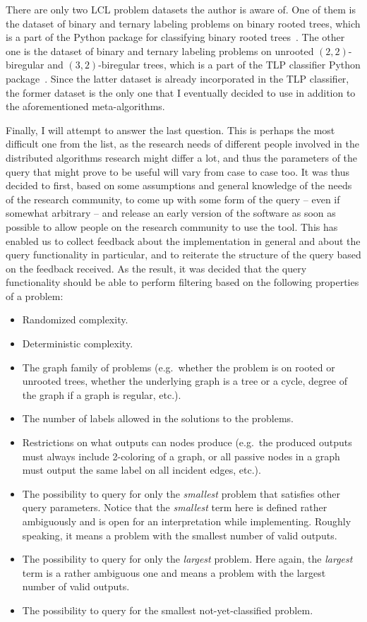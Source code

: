 There are only two LCL problem datasets the author is aware of. One of them is the dataset of binary and ternary labeling problems on binary rooted trees, which is a
part of the Python package for classifying binary rooted trees~\cite{Tereshchenko2020brt}. The other one is the dataset of binary and ternary labeling problems on
unrooted $(2, 2)$-biregular and $(3, 2)$-biregular trees, which is a part of the TLP classifier Python package~\cite{Rocher2020clas}. Since the latter dataset is already incorporated in the TLP classifier,
the former dataset is the only one that I eventually decided to use
in addition to the aforementioned meta-algorithms.

Finally, I will attempt to answer the last question.
This is perhaps the most difficult one from the list,
as the research needs of different people involved in
the distributed algorithms research might differ a lot, and thus
the parameters of the query that might prove to be useful
will vary from case to case too. It was thus decided to first,
based on some assumptions and general knowledge of the
needs of the research community, to come up with some form of the
query -- even if somewhat arbitrary -- and release an early version
of the software as soon as possible to allow people on the
research community to use the tool. This has enabled us to
collect feedback about the implementation in general and about the
query functionality in particular, and to reiterate the structure of
the query based on the feedback received. As the result, it was
decided that the query functionality should be able to perform
filtering based on the following properties of a problem:

\begin{itemize}
  \item Randomized complexity.
  \item Deterministic complexity.
  \item The graph family of problems (e.g.\ whether the problem is on
  rooted or unrooted trees, whether the underlying graph is a tree
  or a cycle, degree of the graph if a graph is regular, etc.).
  \item The number of labels allowed in the solutions to the problems.
  \item Restrictions on what outputs can nodes produce (e.g.\ the
  produced outputs must always include 2-coloring of a graph,
  or all passive nodes in a graph must output the same
  label on all incident edges, etc.).
  \item The possibility to query for only the \emph{smallest} problem that
  satisfies other query parameters. Notice that the \emph{smallest} term here is
  defined rather ambiguously and is open for an interpretation while implementing. Roughly speaking, it means a problem with the smallest
  number of valid outputs.
  \item The possibility to query for only the \emph{largest} problem. Here again,
  the \emph{largest} term is a rather ambiguous one and means a problem with the largest
  number of valid outputs.
  \item The possibility to query for the smallest not-yet-classified problem.
\end{itemize}
